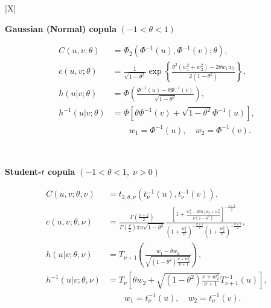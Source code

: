 \documentclass[12pt,oneside,a4paper]{book}
\theoremstyle{definition}
\theoremstyle{remark}
\begin{document}
	\begin{table}[H]
		\centering
		\renewcommand{\arraystretch}{1.3}
		\small
		\begin{tabularx}{\textwidth}{|X|}
			\hline

			\textbf{Gaussian (Normal) copula}
			$\left(-1 < \theta < 1\right)$
			\\ \hline

			\[
			\begin{aligned}
				C(u,v;\theta)
				&= \Phi_2\left(
				\Phi^{-1}(u),\Phi^{-1}(v);\theta
				\right),\\[2pt]
				c(u,v;\theta)
				&=
				\frac{1}{\sqrt{1-\theta^2}}
				\exp\left\{
				\frac{
					\theta^2(w_1^2+w_2^2)-2\theta w_1w_2
				}{
					2(1-\theta^2)
				}
				\right\},\\[2pt]
				h(u|v;\theta)
				&=
				\Phi\left(
				\frac{
					\Phi^{-1}(u)-\theta\Phi^{-1}(v)
				}{
					\sqrt{1-\theta^2}
				}
				\right),\\[2pt]
				h^{-1}(u|v;\theta)
				&=
				\Phi\left[
				\theta\Phi^{-1}(v)
				+
				\sqrt{1-\theta^2}\Phi^{-1}(u)
				\right],\\[2pt]
				&\qquad
				w_1=\Phi^{-1}(u),\quad
				w_2=\Phi^{-1}(v).
			\end{aligned}
			\]

			\\ \hline

			\textbf{Student-$t$ copula}
			$\left(-1 < \theta < 1,\;\nu>0\right)$
			\\ \hline

			\[
			\begin{aligned}
				C(u,v;\theta,\nu)
				&=
				t_{2,\theta,\nu}
				\left(
				t_\nu^{-1}(u),t_\nu^{-1}(v)
				\right),\\[2pt]
				c(u,v;\theta,\nu)
				&=
				\frac{
					\Gamma\left(\frac{\nu+2}{2}\right)
				}{
					\Gamma\left(\frac{\nu}{2}\right)
					\pi\nu\sqrt{1-\theta^2}
				}
				\frac{
					\left[
					1+
					\frac{
						w_1^2-2\theta w_1w_2+w_2^2
					}{
						\nu(1-\theta^2)
					}
					\right]^{-\frac{\nu+2}{2}}
				}{
					\left(1+\frac{w_1^2}{\nu}\right)^{-\frac{\nu+1}{2}}
					\left(1+\frac{w_2^2}{\nu}\right)^{-\frac{\nu+1}{2}}
				},\\[2pt]
				h(u|v;\theta,\nu)
				&=
				T_{\nu+1}\left(
				\frac{
					w_1-\theta w_2
				}{
					\sqrt{
						(1-\theta^2)
						\frac{\nu+w_2^2}{\nu+1}
					}
				}
				\right),\\[2pt]
				h^{-1}(u|v;\theta,\nu)
				&=
				T_\nu\left[
				\theta w_2+
				\sqrt{
					(1-\theta^2)
					\frac{\nu+w_2^2}{\nu+1}
				}
				T_{\nu+1}^{-1}(u)
				\right],\\[2pt]
				&\qquad
				w_1=t_\nu^{-1}(u),\quad
				w_2=t_\nu^{-1}(v).
			\end{aligned}
			\]


\end{tabularx}
\end{table}
\end{document}
